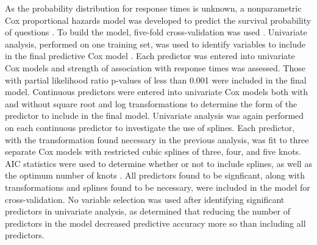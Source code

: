 \documentclass{article}
\begin{document}
As the probability distribution for response times is unknown, a nonparametric Cox proportional hazards model was developed to predict the survival probability of questions \cite{Moore2010}. To build the model, five-fold cross-validation was used \cite{Rodriguez2010}. Univariate analysis, performed on one training set, was used to identify variables to include in the final predictive Cox model \cite{Hammermeister1979}. Each predictor was entered into univariate Cox models and strength of association with response times was assessed. Those with partial likelihood ratio p-values of less than 0.001 were included in the final model.  Continuous predictors were entered into univariate Cox models both with and without square root and log transformations to determine the form of the predictor to include in the final model. Univariate analysis was again performed on each continuous predictor to investigate the use of splines. Each predictor, with the transformation found necessary in the previous analysis, was fit to three separate Cox models with restricted cubic splines of three, four, and five knots. AIC statistics were used to determine whether or not to include splines, as well as the optimum number of knots \cite{Harrell2015}. All predictors found to be signficant, along with transformations and splines found to be necessary, were included in the model for cross-validation. No variable selection was used after identifying significant predictors in univariate analysis, as \cite{Harrell2015} determined that reducing the number of predictors in the model decreased predictive accuracy more so than including all predictors. 
\end{document}
